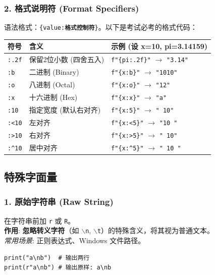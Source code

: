 \documentclass[12pt, a4paper]{article}
\begin{document}
\subsubsection{2. 格式说明符 (Format Specifiers)}

语法格式：\texttt{\{value:\textbf{格式控制符}\}}。以下是考试必考的格式代码：

\begin{table}[ht]
\centering
\begin{tabular}{l l l}
\toprule
\textbf{符号} & \textbf{含义} & \textbf{示例 (设 x=10, pi=3.14159)} \\
\midrule
\texttt{:.2f} & 保留2位小数 (四舍五入) & \texttt{f"\{pi:.2f\}"} $\to$ \texttt{"3.14"} \\
\texttt{:b} & 二进制 (Binary) & \texttt{f"\{x:b\}"} $\to$ \texttt{"1010"} \\
\texttt{:o} & 八进制 (Octal) & \texttt{f"\{x:o\}"} $\to$ \texttt{"12"} \\
\texttt{:x} & 十六进制 (Hex) & \texttt{f"\{x:x\}"} $\to$ \texttt{"a"} \\
\midrule
\texttt{:10} & 指定宽度 (默认右对齐) & \texttt{f"\{x:5\}"} $\to$ \texttt{"   10"} \\
\texttt{:<10} & 左对齐 & \texttt{f"\{x:<5\}"} $\to$ \texttt{"10   "} \\
\texttt{:>10} & 右对齐 & \texttt{f"\{x:>5\}"} $\to$ \texttt{"   10"} \\
\texttt{:\^{}10} & 居中对齐 & \texttt{f"\{x:\^{}5\}"} $\to$ \texttt{" 10  "} \\
\bottomrule
\end{tabular}
\end{table}

\subsection{特殊字面量}

\subsubsection{1. 原始字符串 (Raw String)}
在字符串前加 \texttt{r} 或 \texttt{R}。
\\ \textbf{作用}: \textbf{忽略转义字符}（如 \texttt{$\backslash$n}, \texttt{$\backslash$t}）的特殊含义，将其视为普通文本。
\\ \textit{常用场景}: 正则表达式、Windows 文件路径。
\begin{lstlisting}
print("a\nb")  # 输出两行
print(r"a\nb") # 输出原样: a\nb
\end{lstlisting}
\end{document}
